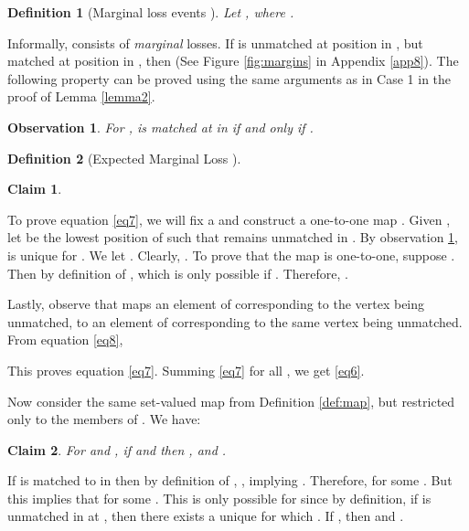 \documentclass[11pt]{article}
\newtheorem{definition}{Definition}
\newtheorem{claim}{Claim}
\newtheorem{observation}{Observation}
\newcommand{\qed}{}
\newenvironment{proof}{\noindent{\em Proof:}}{\hfill \qed \medskip}
\begin{document}
\begin{definition}[Marginal loss events ] 
\label{def:margin}
Let , where .
\end{definition}

Informally,  consists of \emph{marginal} losses. If  is
unmatched at position  in , but matched at position 
in , then  (See Figure
\ref{fig:margins} in Appendix \ref{app8}). The following property can be proved using the same arguments
as in Case 1 in the proof of Lemma \ref{lemma2}.

\begin{observation}
\label{obs2}
For ,  is matched at  in  if and only if .
\end{observation}

\begin{definition}[Expected Marginal Loss ]

\end{definition}


\begin{claim}
\label{claim2}



\end{claim}
\begin{proof}
To prove equation \eqref{eq7}, we will fix a  and construct a
one-to-one map . Given
, let  be the lowest position of  such
that  remains unmatched in . By observation \ref{obs2},
 is unique for . We let . Clearly, . To prove that the map is one-to-one, suppose . Then by definition of ,  which is only possible if . Therefore, .

Lastly, observe that  maps an element of  corresponding to the
vertex  being unmatched, to an element of  corresponding to
the same vertex  being unmatched. From equation \eqref{eq8},



This proves equation \eqref{eq7}. Summing \eqref{eq7} for all , we get \eqref{eq6}.
\end{proof}

Now consider the same set-valued map  from Definition \ref{def:map}, but restricted only to the members of . We have:

\begin{claim}
\label{claim3}
For  and , if  and  then , 
and .
\end{claim}
\begin{proof}
If  is matched to  in  then by definition of , , implying . Therefore,  for some . But this implies
that  for some . This is only
possible for  since by definition, if  is unmatched in
 at , then there exists a unique  for which
. If , then  and .
\end{proof}
\end{document}
